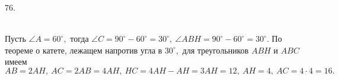 76. \begin{figure}[ht!]
\end{figure}\\
Пусть $\angle A=60^\circ,$ тогда $\angle C=90^\circ-60^\circ=30^\circ,\ \angle ABH=90^\circ-60^\circ=30^\circ.$ По теореме о катете, лежащем напротив угла в $30^\circ,$ для треугольников $ABH$ и $ABC$ имеем $AB=2AH,\ AC=2AB=4AH,\ HC=4AH-AH=3AH=12,\ AH=4,\ AC=4\cdot4=16.$\\
